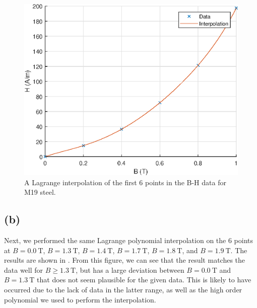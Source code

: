 \documentclass[journal,hidelinks]{IEEEtran}
\begin{document}
\begin{figure}[!htb]
  \centering
  \includegraphics[width=\columnwidth]{question-1/q1a.eps}
  \caption{A Lagrange interpolation of the first $6$ points in the B-H data for M19 steel.}
  \label{fig:q1a}
\end{figure}

\subsection*{(b)}

Next, we performed the same Lagrange polynomial interpolation on the $6$ points at $B = \SI{0.0}{\tesla}$, $B = \SI{1.3}{\tesla}$, $B = \SI{1.4}{\tesla}$, $B = \SI{1.7}{\tesla}$, $B = \SI{1.8}{\tesla}$, and $B = \SI{1.9}{\tesla}$.  The results are shown in . From this figure, we can see that the result matches the data well for $B \ge \SI{1.3}{\tesla}$, but has a large deviation between $B = \SI{0.0}{\tesla}$ and $B = \SI{1.3}{\tesla}$ that does not seem plausible for the given data. This is likely to have occurred due to the lack of data in the latter range, as well as the high order polynomial we used to perform the interpolation.
\end{document}
